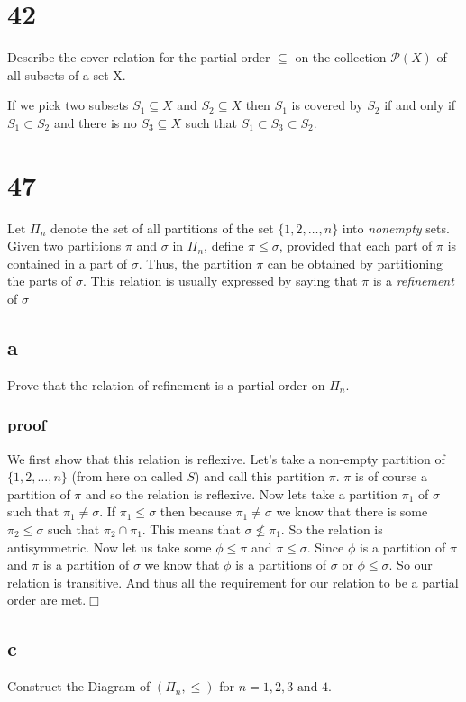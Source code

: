 \documentclass{article}
\begin{document}
\section*{42}
Describe the cover relation for the partial order $\subseteq$ on the collection $\mathcal{P}(X)$ of all subsets of a set X.

If we pick two subsets $S_1\subseteq X$ and $S_2\subseteq X$ then $S_1$ is covered by $S_2$ if and only if $S_1\subset S_2$ and there is no $S_3\subseteq X$ such that $S_1\subset S_3\subset S_2$.
\section*{47}
Let $\Pi_n$ denote the set of all partitions of the set $\{1,2,\dots,n\}$ into \emph{nonempty} sets. Given two partitions $\pi$ and $\sigma$ in $\Pi_n$, define $\pi\leq\sigma$, provided that each part of $\pi$ is contained in a part of $\sigma$. Thus, the partition $\pi$ can be obtained by partitioning the parts of $\sigma$. This relation is usually expressed by saying that $\pi$ is a \emph{refinement} of $\sigma$
\subsection*{a}
Prove that the relation of refinement is a partial order on $\Pi_n$.
\subsubsection*{proof}
We first show that this relation is reflexive. Let's take a non-empty partition of $\{1,2,\dots,n\}$ (from here on called $S$) and call this partition $\pi$. $\pi$ is of course a partition of $\pi$ and so the relation is reflexive. Now lets take a partition $\pi_1$ of $\sigma$ such that $\pi_1\neq\sigma$. If $\pi_1\leq\sigma$ then because $\pi_1\neq\sigma$ we know that there is some $\pi_2\leq\sigma$ such that $\pi_2\cap\pi_1$. This means that $\sigma\nleq\pi_1$. So the relation is antisymmetric. Now let us take some $\phi\leq\pi$ and $\pi\leq\sigma$. Since $\phi$ is a partition of $\pi$ and $\pi$ is a partition of $\sigma$ we know that $\phi$ is a partitions of $\sigma$ or $\phi\leq\sigma$. So our relation is transitive. And thus all the requirement for our relation to be a partial order are met.$\Box$ 
\subsection*{c}
Construct the Diagram of $(\Pi_n,\leq)$ for $n=1,2,3\text{ and }4$.
\end{document}
